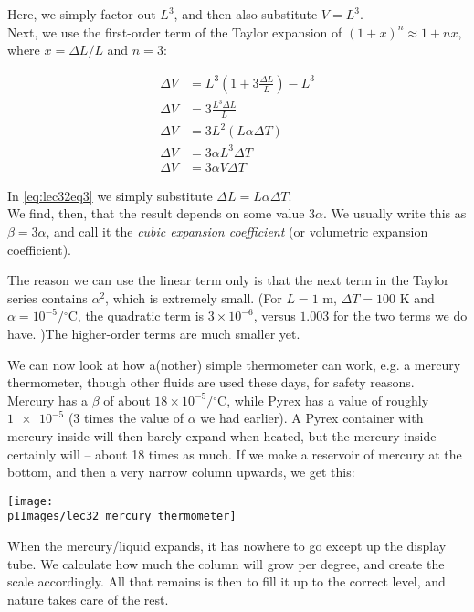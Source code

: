 Here, we simply factor out $L^3$, and then also substitute $V = L^3$.\\
Next, we use the first-order term of the Taylor expansion of $(1 + x)^n \approx 1 + n x$, where $x = \Delta L/L$ and $n = 3$:

\begin{align}
\Delta V &= L^3 (1 + 3 \frac{\Delta L}{L})     - L^3\\
\Delta V &= 3 \frac{L^3 \Delta L}{L}\\
\Delta V &= 3 L^2 (L \alpha \Delta T) \label{eq:lec32eq3}\\
\Delta V &= 3 \alpha L^3  \Delta T\\
\Delta V &= 3 \alpha V  \Delta T
\end{align}

In \eqref{eq:lec32eq3} we simply substitute $\Delta L = L \alpha \Delta T$.\\
We find, then, that the result depends on some value $3 \alpha$. We usually write this as $\beta = 3 \alpha$, and call it the \emph{cubic expansion coefficient} (or volumetric expansion coefficient).

The reason we can use the linear term only is that the next term in the Taylor series contains $\alpha^2$, which is extremely small. (For $L = 1$ m, $\Delta T = 100$ K and $\alpha = 10^{-5}/{}^\circ$C, the quadratic term is $3 \times 10^{-6}$, versus $1.003$ for the two terms we do have. )The higher-order terms are much smaller yet.

We can now look at how a(nother) simple thermometer can work, e.g. a mercury thermometer, though other fluids are used these days, for safety reasons.\\
Mercury has a $\beta$ of about $18 \times 10^{-5}/{}^\circ$C, while Pyrex has a value of roughly $\num{1e-5}$ (3 times the value of $\alpha$ we had earlier). A Pyrex container with mercury inside will then barely expand when heated, but the mercury inside certainly will -- about 18 times as much. If we make a reservoir of mercury at the bottom, and then a very narrow column upwards, we get this:

\begin{center}
\texttt{[image: \\pIImages/lec32\_mercury\_thermometer]}
\end{center}

When the mercury/liquid expands, it has nowhere to go except up the display tube. We calculate how much the column will grow per degree, and create the scale accordingly. All that remains is then to fill it up to the correct level, and nature takes care of the rest.


